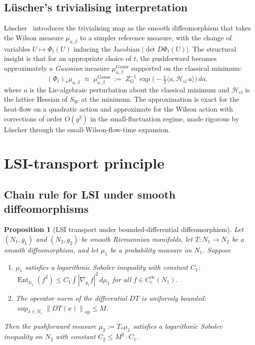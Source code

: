 \documentclass[11pt,a4paper]{amsart}
\newtheorem{proposition}[theorem]{Proposition}
\theoremstyle{definition}
\newcommand{\norm}[1]{\left\lVert#1\right\rVert}
\newcommand{\abs}[1]{\left\lvert#1\right\rvert}
\DeclareMathOperator{\Ent}{Ent}
\begin{document}
\subsection{L\"uscher's trivialising interpretation}
L\"uscher~\cite{Luscher2009TrivializingMaps} introduces the
trivialising map as the smooth diffeomorphism that takes the Wilson
measure $\mu_{a,\beta}$ to a simpler reference measure, with the change
of variables $U \mapsto \Phi_t(U)$ inducing the Jacobian
$\abs{\det D\Phi_t(U)}$. The structural insight is that for an
appropriate choice of $t$, the pushforward becomes approximately a
\emph{Gaussian} measure $\mu^\mathrm{Gauss}_{a,\beta}$ supported on the
classical minimum:
\begin{equation}\label{eq:pushforward}
(\Phi_t)_* \mu_{a,\beta}
\;\approx\; \mu^\mathrm{Gauss}_{a,\beta}
\;:=\; Z_\mathrm{G}^{-1}\,\exp\bigl(-\tfrac12 \langle a,
\mathcal H_\mathrm{cl}\,a\rangle\bigr)\,da,
\end{equation}
where $a$ is the Lie-algebraic perturbation about the classical minimum
and $\mathcal H_\mathrm{cl}$ is the lattice Hessian of $S_W$ at the
minimum. The approximation is exact for the heat-flow on a quadratic
action and approximate for the Wilson action with corrections of order
$O(g^2)$ in the small-fluctuation regime, made rigorous by L\"uscher
through the small-Wilson-flow-time expansion.

\section{LSI-transport principle}\label{sec:transport}

\subsection{Chain rule for LSI under smooth diffeomorphisms}

\begin{proposition}[LSI transport under bounded-differential diffeomorphism]
\label{prop:transport}
Let $(N_1, g_1)$ and $(N_2, g_2)$ be smooth Riemannian manifolds, let
$T : N_1 \to N_2$ be a smooth diffeomorphism, and let $\mu_1$ be a
probability measure on $N_1$. Suppose
\begin{enumerate}[label=(\roman*),leftmargin=2em]
\item $\mu_1$ satisfies a logarithmic Sobolev inequality with constant
$C_1$: $\Ent_{\mu_1}(f^2) \leq C_1 \int |\nabla_{g_1}f|^2 \,d\mu_1$ for
all $f \in C^\infty_c(N_1)$.
\item The operator norm of the differential $DT$ is uniformly bounded:
$\sup_{x\in N_1} \norm{DT(x)}_\mathrm{op} \leq M$.
\end{enumerate}
Then the pushforward measure $\mu_2 := T_*\mu_1$ satisfies a logarithmic
Sobolev inequality on $N_2$ with constant $C_2 \leq M^2 \cdot C_1$.
\end{proposition}
\end{document}
